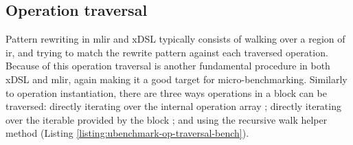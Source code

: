 

\subsection{Operation traversal}
\label{ssec:ubenchmark-operation-traversal}

Pattern rewriting in \ac{mlir} and xDSL typically consists of walking over a region of \ac{ir}, and trying to match the rewrite pattern against each traversed operation.
Because of this operation traversal is another fundamental procedure in both xDSL and \ac{mlir}, again making it a good target for micro-benchmarking. Similarly to operation instantiation, there are three ways operations in a block can be traversed: directly iterating over the internal operation array ; directly iterating over the iterable provided by the block ; and using the recursive walk helper method  (Listing \ref{listing:ubenchmark-op-traversal-bench}).

